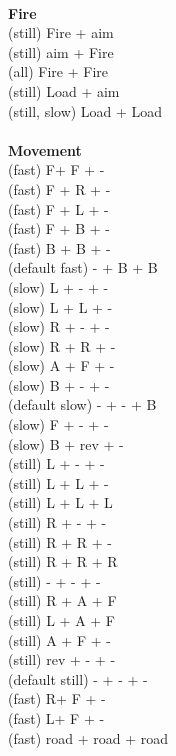 \ \\ {\bf Fire } \\
(still) Fire + aim \\
(still) aim + Fire \\
(all) Fire + Fire  \\
(still) Load + aim \\
(still, slow) Load + Load \\
\ \\ {\bf Movement } \\
(fast) F+ F + - \\
(fast) F + R + - \\
(fast) F + L + - \\
(fast) F + B + - \\
(fast) B + B + - \\
(default fast) - + B + B \\
(slow) L + - + - \\
(slow) L + L + - \\
(slow) R + - + - \\
(slow) R + R + - \\
(slow) A + F + - \\
(slow) B + - + - \\
(default slow) - + - + B \\
(slow) F + - + - \\
(slow) B + rev + - \\
(still) L + - + - \\
(still) L + L + - \\
(still) L + L + L \\
(still) R + - + - \\
(still) R + R + - \\
(still) R + R + R \\
(still) - + - + - \\
(still) R + A + F \\
(still) L + A + F \\
(still) A + F + - \\
(still) rev + - + - \\
(default still) - + - + - \\
(fast) R+ F + - \\
(fast) L+ F + - \\
(fast) road + road + road \\



